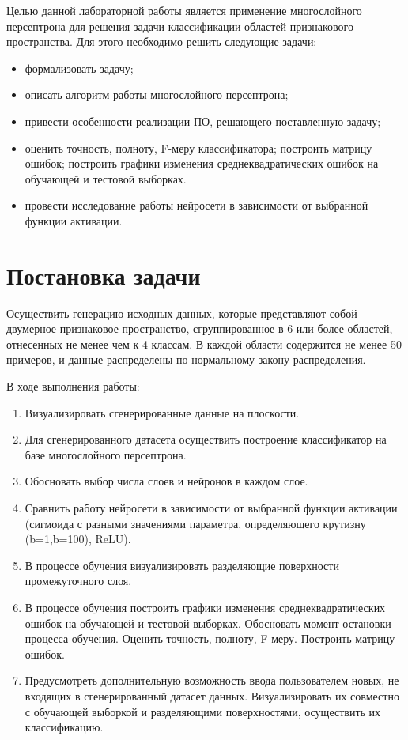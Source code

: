 \documentclass[12pt]{report}
\begin{document}
Целью данной лабораторной работы является применение многослойного персептрона для решения задачи классификации областей признакового пространства.
Для этого необходимо решить следующие задачи:
\begin{itemize}
    \item формализовать задачу;
    \item описать алгоритм работы многослойного персептрона;
    \item привести особенности реализации ПО, решающего поставленную задачу;
    \item оценить точность, полноту, F-меру классификатора; построить матрицу ошибок; построить графики изменения среднеквадратических ошибок на обучающей и тестовой  выборках.
    \item провести исследование работы нейросети в зависимости от выбранной функции активации.
\end{itemize}

\section{Постановка задачи}

Осуществить генерацию исходных данных, которые представляют собой двумерное признаковое пространство, сгруппированное в 6 или более областей, отнесенных не менее чем к 4 классам. В каждой области содержится не менее 50 примеров, и данные распределены по нормальному закону распределения.  

В ходе выполнения работы:
\begin{enumerate}
    \item Визуализировать сгенерированные данные на плоскости.
    \item Для  сгенерированного датасета осуществить построение классификатор на базе многослойного персептрона. 
    \item Обосновать выбор числа слоев и нейронов в каждом слое. 
    \item Сравнить работу нейросети в зависимости от выбранной функции активации (сигмоида с разными значениями параметра, определяющего крутизну (b=1,b=100), ReLU).
    \item В процессе обучения визуализировать разделяющие поверхности промежуточного слоя. 
    \item В процессе обучения построить графики изменения среднеквадратических ошибок на обучающей и тестовой  выборках. Обосновать момент остановки процесса обучения.
	Оценить точность, полноту, F-меру. Построить матрицу ошибок.
    \item Предусмотреть дополнительную возможность ввода пользователем новых, не входящих в сгенерированный датасет данных. Визуализировать их совместно с обучающей выборкой и разделяющими поверхностями, осуществить их классификацию. 
\end{enumerate}
\end{document}
